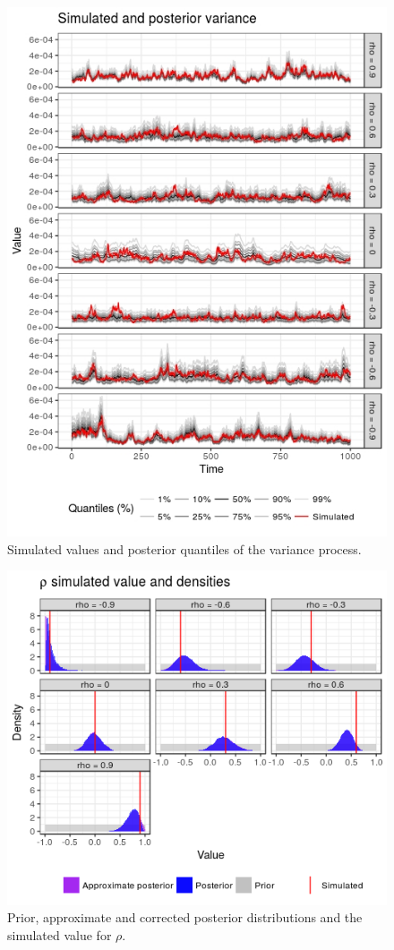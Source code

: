 \begin{figure}
	\centering
	\includegraphics[width=\linewidth]{simulations/variance-plot}
	\caption{Simulated values and posterior quantiles of the variance process.}
	\label{fig:volatility}
\end{figure}

\begin{figure}
	\centering
	\includegraphics[width=\linewidth]{simulations/rho-densities}
	\caption{Prior, approximate and corrected posterior distributions and the simulated value for $\rho$.}
	\label{fig:rhodensities}
\end{figure}

